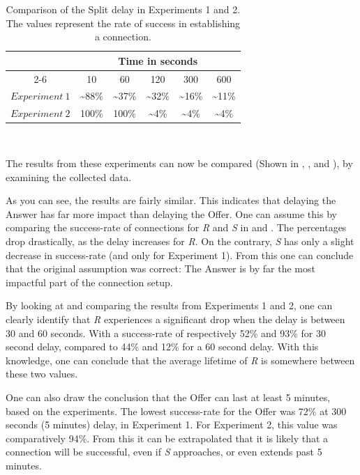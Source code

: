 %
\begin{table}
	\caption[Comparison of Split delay]{Comparison of the Split delay in Experiments 1 and 2. The values represent the rate of success in establishing a connection.}
	\label{tab:comp_split}
	\centering
	\begin{tabular}{c@{\qquad}ccccc}
      	\multirow{3}{*}{\raisebox{-\heavyrulewidth}{Split~delay}} & \multicolumn{5}{c}{Time in seconds}\\
	  	\cmidrule{2-6}
        & 10 & 60 & 120 & 300 & 600\\
        \midrule
        $Experiment~1$ & \textasciitilde88\% & \textasciitilde37\% & \textasciitilde32\% & \textasciitilde16\% & \textasciitilde11\% \\
        $Experiment~2$ & 100\% & 100\% & \textasciitilde4\% & \textasciitilde4\% & \textasciitilde4\% \\
        \bottomrule
	\end{tabular}\\
\end{table}
%
The results from these experiments can now be compared (Shown in , ,  and ), by examining the collected data.

As you can see, the results are fairly similar. This indicates that delaying the Answer has far more impact than delaying the Offer. One can assume this by comparing the success-rate of connections for \textit{R} and \textit{S} in  and . The percentages drop drastically, as the delay increases for \textit{R}. On the contrary, \textit{S} has only a slight decrease in success-rate (and only for Experiment 1). From this one can conclude that the original assumption was correct: The Answer is by far the most impactful part of the connection setup.

By looking at and comparing the results from Experiments 1 and 2, one can clearly identify that \textit{R} experiences a significant drop when the delay is between 30 and 60 seconds. With a success-rate of respectively 52\% and 93\% for 30 second delay, compared to 44\% and 12\% for a 60 second delay. With this knowledge, one can conclude that the average lifetime of \textit{R} is somewhere between these two values.

One can also draw the conclusion that the Offer can last at least 5 minutes, based on the experiments. The lowest success-rate for the Offer was 72\% at 300 seconds (5 minutes) delay, in Experiment 1. For Experiment 2, this value was comparatively 94\%. From this it can be extrapolated that it is likely that a connection will be successful, even if \textit{S} approaches, or even extends past 5 minutes.

